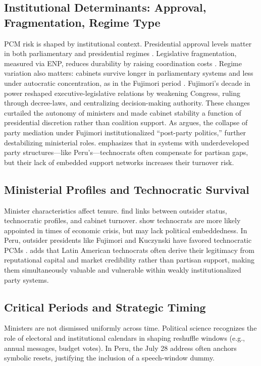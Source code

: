 \documentclass[a4paper, 12pt]{article}
\begin{document}
\subsection{Institutional Determinants: Approval, Fragmentation, Regime Type}
PCM risk is shaped by institutional context. Presidential approval levels matter in both parliamentary and presidential regimes \citep{fischer_duration_2012}. Legislative fragmentation, measured via ENP, reduces durability by raising coordination costs \citep{huber_replacing_2008}. Regime variation also matters: cabinets survive longer in parliamentary systems and less under autocratic concentration, as in the Fujimori period \citep{perezlinan2007}. Fujimori's decade in power reshaped executive-legislative relations by weakening Congress, ruling through decree-laws, and centralizing decision-making authority. These changes curtailed the autonomy of ministers and made cabinet stability a function of presidential discretion rather than coalition support. As \citet{levitsky_latin_1999} argues, the collapse of party mediation under Fujimori institutionalized ``post-party politics,'' further destabilizing ministerial roles. \citet[dpp. 10--12]{dargent_technocracy_2014} emphasizes that in systems with underdeveloped party structures—like Peru’s—technocrats often compensate for partisan gaps, but their lack of embedded support networks increases their turnover risk.

\subsection{Ministerial Profiles and Technocratic Survival}
Minister characteristics affect tenure. \citet{escobar-lemmon_coming_2010} find links between outsider status, technocratic profiles, and cabinet turnover. \citet{alexiadou_commitment_2019} show technocrats are more likely appointed in times of economic crisis, but may lack political embeddedness. In Peru, outsider presidents like Fujimori and Kuczynski have favored technocratic PCMs \citep{carreras_presidentes_2013}. \citet{dargent_technocracy_2014} adds that Latin American technocrats often derive their legitimacy from reputational capital and market credibility rather than partisan support, making them simultaneously valuable and vulnerable within weakly institutionalized party systems.

\subsection{Critical Periods and Strategic Timing}
Ministers are not dismissed uniformly across time. Political science recognizes the role of electoral and institutional calendars in shaping reshuffle windows (e.g., annual messages, budget votes). In Peru, the July 28 address often anchors symbolic resets, justifying the inclusion of a speech-window dummy.
\end{document}
